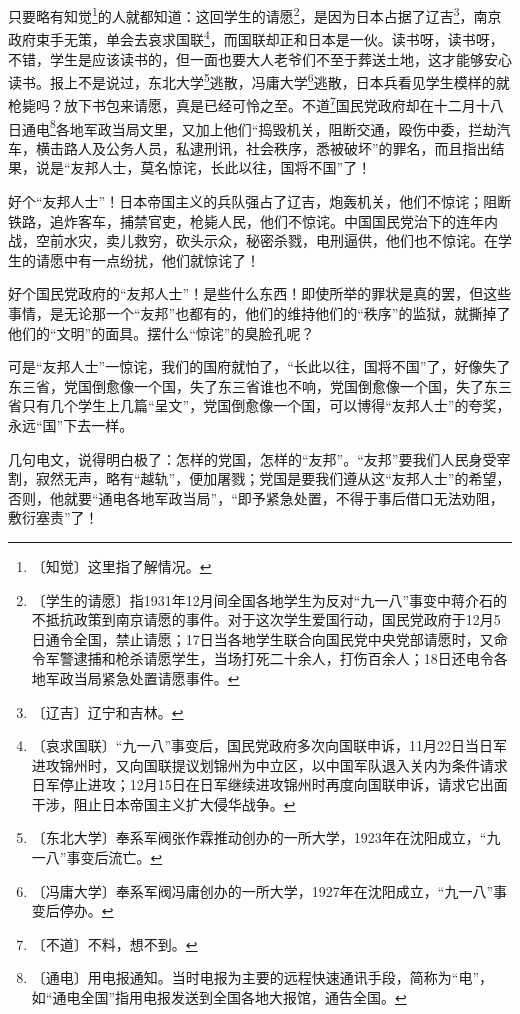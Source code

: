 \documentclass[12pt,UTF-8,openany]{ctexbook}
\begin{document}
\begin{large}
    
    只要略有知觉\footnote{〔知觉〕这里指了解情况。}的人就都知道：这回学生的请愿\footnote{〔学生的请愿〕指1931年12月间全国各地学生为反对“九一八”事变中蒋介石的不抵抗政策到南京请愿的事件。对于这次学生爱国行动，国民党政府于12月5日通令全国，禁止请愿；17日当各地学生联合向国民党中央党部请愿时，又命令军警逮捕和枪杀请愿学生，当场打死二十余人，打伤百余人；18日还电令各地军政当局紧急处置请愿事件。}，是因为日本占据了辽吉\footnote{〔辽吉〕辽宁和吉林。}，南京政府束手无策，单会去哀求国联\footnote{〔哀求国联〕“九一八”事变后，国民党政府多次向国联申诉，11月22日当日军进攻锦州时，又向国联提议划锦州为中立区，以中国军队退入关内为条件请求日军停止进攻；12月15日在日军继续进攻锦州时再度向国联申诉，请求它出面干涉，阻止日本帝国主义扩大侵华战争。}，而国联却正和日本是一伙。读书呀，读书呀，不错，学生是应该读书的，但一面也要大人老爷们不至于葬送土地，这才能够安心读书。报上不是说过，东北大学\footnote{〔东北大学〕奉系军阀张作霖推动创办的一所大学，1923年在沈阳成立，“九一八”事变后流亡。}逃散，冯庸大学\footnote{〔冯庸大学〕奉系军阀冯庸创办的一所大学，1927年在沈阳成立，“九一八”事变后停办。}逃散，日本兵看见学生模样的就枪毙吗？放下书包来请愿，真是已经可怜之至。不道\footnote{〔不道〕不料，想不到。}国民党政府却在十二月十八日通电\footnote{〔通电〕用电报通知。当时电报为主要的远程快速通讯手段，简称为“电”，如“通电全国”指用电报发送到全国各地大报馆，通告全国。}各地军政当局文里，又加上他们“捣毁机关，阻断交通，殴伤中委，拦劫汽车，横击路人及公务人员，私逮刑讯，社会秩序，悉被破坏”的罪名，而且指出结果，说是“友邦人士，莫名惊诧，长此以往，国将不国”了！
    
    好个“友邦人士”！日本帝国主义的兵队强占了辽吉，炮轰机关，他们不惊诧；阻断铁路，追炸客车，捕禁官吏，枪毙人民，他们不惊诧。中国国民党治下的连年内战，空前水灾，卖儿救穷，砍头示众，秘密杀戮，电刑逼供，他们也不惊诧。在学生的请愿中有一点纷扰，他们就惊诧了！
    
    好个国民党政府的“友邦人士”！是些什么东西！即使所举的罪状是真的罢，但这些事情，是无论那一个“友邦”也都有的，他们的维持他们的“秩序”的监狱，就撕掉了他们的“文明”的面具。摆什么“惊诧”的臭脸孔呢？
    
    可是“友邦人士”一惊诧，我们的国府就怕了，“长此以往，国将不国”了，好像失了东三省，党国倒愈像一个国，失了东三省谁也不响，党国倒愈像一个国，失了东三省只有几个学生上几篇“呈文”，党国倒愈像一个国，可以博得“友邦人士”的夸奖，永远“国”下去一样。
    
    几句电文，说得明白极了：怎样的党国，怎样的“友邦”。“友邦”要我们人民身受宰割，寂然无声，略有“越轨”，便加屠戮；党国是要我们遵从这“友邦人士”的希望，否则，他就要“通电各地军政当局”，“即予紧急处置，不得于事后借口无法劝阻，敷衍塞责”了！
    

\end{large}
\end{document}
